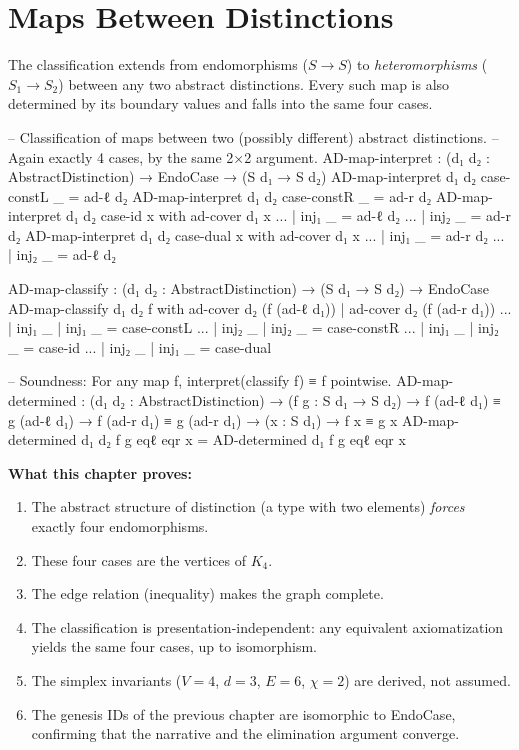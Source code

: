 \documentclass[11pt,a4paper]{book}
\begin{document}
\section{Maps Between Distinctions}
\label{sec:maps-between}

The classification extends from endomorphisms ($S \to S$) to \emph{heteromorphisms}
($S_1 \to S_2$) between any two abstract distinctions. Every such map is also determined
by its boundary values and falls into the same four cases.

\begin{code}
-- Classification of maps between two (possibly different) abstract distinctions.
-- Again exactly 4 cases, by the same 2×2 argument.
AD-map-interpret : (d₁ d₂ : AbstractDistinction) → EndoCase → (S d₁ → S d₂)
AD-map-interpret d₁ d₂ case-constL _ = ad-ℓ d₂
AD-map-interpret d₁ d₂ case-constR _ = ad-r d₂
AD-map-interpret d₁ d₂ case-id     x with ad-cover d₁ x
... | inj₁ _ = ad-ℓ d₂
... | inj₂ _ = ad-r d₂
AD-map-interpret d₁ d₂ case-dual   x with ad-cover d₁ x
... | inj₁ _ = ad-r d₂
... | inj₂ _ = ad-ℓ d₂

AD-map-classify : (d₁ d₂ : AbstractDistinction) → (S d₁ → S d₂) → EndoCase
AD-map-classify d₁ d₂ f with ad-cover d₂ (f (ad-ℓ d₁)) | ad-cover d₂ (f (ad-r d₁))
... | inj₁ _ | inj₁ _ = case-constL
... | inj₂ _ | inj₂ _ = case-constR
... | inj₁ _ | inj₂ _ = case-id
... | inj₂ _ | inj₁ _ = case-dual

-- Soundness: For any map f, interpret(classify f) ≡ f pointwise.
AD-map-determined : (d₁ d₂ : AbstractDistinction) →
                    (f g : S d₁ → S d₂) →
                    f (ad-ℓ d₁) ≡ g (ad-ℓ d₁) →
                    f (ad-r d₁) ≡ g (ad-r d₁) →
                    (x : S d₁) → f x ≡ g x
AD-map-determined d₁ d₂ f g eqℓ eqr x = AD-determined d₁ f g eqℓ eqr x
\end{code}

\medskip
\noindent\textbf{What this chapter proves:}
\begin{enumerate}
\item The abstract structure of distinction (a type with two elements) \emph{forces}
exactly four endomorphisms.
\item These four cases are the vertices of $K_4$.
\item The edge relation (inequality) makes the graph complete.
\item The classification is presentation-independent: any equivalent axiomatization
yields the same four cases, up to isomorphism.
\item The simplex invariants ($V=4$, $d=3$, $E=6$, $\chi=2$) are derived, not assumed.
\item The genesis IDs of the previous chapter are isomorphic to EndoCase, confirming
that the narrative and the elimination argument converge.
\end{enumerate}
\end{document}
